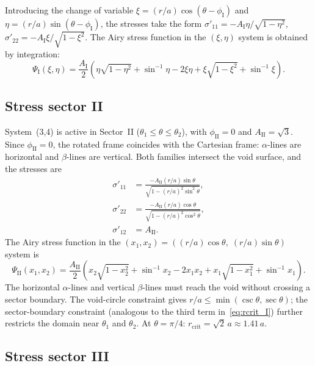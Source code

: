 \documentclass{svjour3} %
\begin{document}
Introducing the change of variable
$\xi = (r/a)\cos(\theta - \phi_{\mathrm{I}})$ and
$\eta = (r/a)\sin(\theta - \phi_{\mathrm{I}})$, the stresses take the form
$\sigma'_{11} = -A_{\mathrm{I}}\eta/\sqrt{1-\eta^2}$,
$\sigma'_{22} = -A_{\mathrm{I}}\xi/\sqrt{1-\xi^2}$. The Airy stress
function in the $(\xi, \eta)$ system is obtained by integration:
\begin{equation}
\label{eq:airy_I}
\Psi_{\mathrm{I}}(\xi, \eta) = \frac{A_{\mathrm{I}}}{2}
  \left(\eta\sqrt{1-\eta^2} + \sin^{-1}\eta
  - 2\xi\eta + \xi\sqrt{1-\xi^2} + \sin^{-1}\xi\right).
\end{equation}

\subsection{Stress sector II}

System~(3,4) is active in Sector~II
($\theta_1 \leq \theta \leq \theta_2$), with
$\phi_{\mathrm{II}} = 0$ and $A_{\mathrm{II}} = \sqrt{3}$. Since
$\phi_{\mathrm{II}} = 0$, the rotated frame coincides with the
Cartesian frame: $\alpha$-lines are horizontal and $\beta$-lines are
vertical. Both families intersect the void surface, and the stresses
are
\begin{align}
\label{eq:s11_sector_II}
\sigma'_{11} &= \frac{-A_{\mathrm{II}}(r/a)\sin\theta}
  {\sqrt{1 - (r/a)^2\sin^2\theta}}, \\
\label{eq:s22_sector_II}
\sigma'_{22} &= \frac{-A_{\mathrm{II}}(r/a)\cos\theta}
  {\sqrt{1 - (r/a)^2\cos^2\theta}}, \\
\sigma'_{12} &= A_{\mathrm{II}}.
\end{align}
The Airy stress function in the
$(x_1, x_2) = ((r/a)\cos\theta,\; (r/a)\sin\theta)$ system is
\begin{equation}
\label{eq:airy_II}
\Psi_{\mathrm{II}}(x_1, x_2) = \frac{A_{\mathrm{II}}}{2}
  \left(x_2\sqrt{1-x_2^2} + \sin^{-1}x_2
  - 2x_1 x_2 + x_1\sqrt{1-x_1^2} + \sin^{-1}x_1\right).
\end{equation}
The horizontal $\alpha$-lines and vertical $\beta$-lines must reach
the void without crossing a sector boundary. The void-circle
constraint gives $r/a \leq \min(\csc\theta, \sec\theta)$; the
sector-boundary constraint (analogous to the third term
in~\eqref{eq:rcrit_I}) further restricts the domain near $\theta_1$
and $\theta_2$. At $\theta = \pi/4$:
$r_{\mathrm{crit}} = \sqrt{2}\,a \approx 1.41\,a$.

\subsection{Stress sector III}
\end{document}
